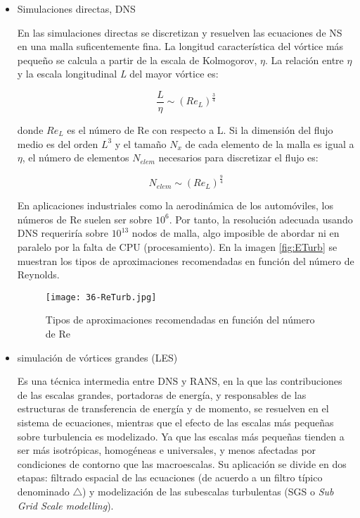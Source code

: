 \begin{itemize}
\item
  Simulaciones directas, DNS

  En las simulaciones directas se discretizan y resuelven las ecuaciones
  de NS en una malla suficentemente fina. La longitud característica del
  vórtice más pequeño se calcula a partir de la escala de Kolmogorov,
  \(\eta\). La relación entre \(\eta\) y la escala longitudinal \emph{L}
  del mayor vórtice es:

  \[\frac {L}{\eta} \sim (Re_L)^{\frac{3}{4}}\]

  donde \(Re_L\) es el número de Re con respecto a L. Si la dimensión
  del flujo medio es del orden \(L^3\) y el tamaño \(N_x\) de cada
  elemento de la malla es igual a \(\eta\), el número de elementos
  \(N_{elem}\) necesarios para discretizar el flujo es:

  \[N_{elem} \sim (Re_L)^{\frac{9}{4}}\]

  En aplicaciones industriales como la aerodinámica de los automóviles,
  los números de Re suelen ser sobre \(10^6\). Por tanto, la resolución
  adecuada usando DNS requeriría sobre \(10^{13}\) nodos de malla, algo
  imposible de abordar ni en paralelo por la falta de CPU
  (procesamiento).
  En la imagen \autoref{fig:ETurb} se muestran los tipos de aproximaciones recomendadas en función del número de Reynolds.

  \begin{figure}
  \centering
  \texttt{[image: 36-ReTurb.jpg]}
  \caption{Tipos de aproximaciones recomendadas en función del número de Re}
  \label{fig:ReTurb}
  \end{figure}


\item
  simulación de vórtices grandes (LES)

  Es una técnica intermedia entre DNS y RANS, en la que las
  contribuciones de las escalas grandes, portadoras de energía, y
  responsables de las estructuras de transferencia de energía y de
  momento, se resuelven en el sistema de ecuaciones, mientras que el
  efecto de las escalas más pequeñas sobre turbulencia es modelizado. Ya
  que las escalas más pequeñas tienden a ser más isotrópicas, homogéneas
  e universales, y menos afectadas por condiciones de contorno que las
  macroescalas. Su aplicación se divide en dos etapas: filtrado espacial
  de las ecuaciones (de acuerdo a un filtro típico denominado
  \(\triangle\)) y modelización de las subescalas turbulentas (SGS o
  \emph{Sub Grid Scale modelling}).


\end{itemize}
